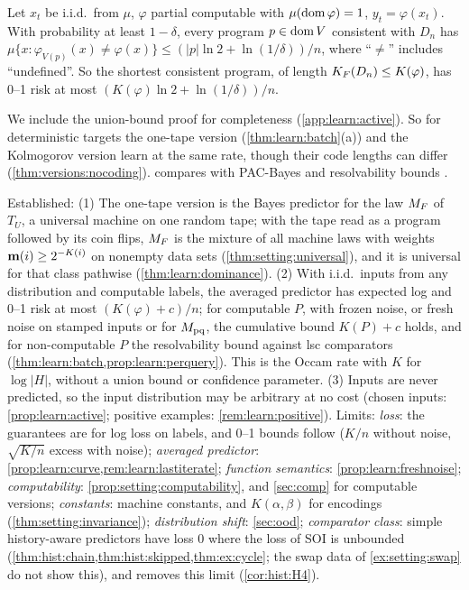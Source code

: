 \begin{proposition}\label{prop:learn:occam}
Let $x_t$ be i.i.d.\ from $\mu$, $\varphi$ partial computable with $\mu(\operatorname{dom}\varphi)=1$, $y_t=\varphi(x_t)$. With probability at least $1-\delta$, every program $p\in\operatorname{dom} V$ consistent with $D_n$ has $\mu\{x:\varphi_{V(p)}(x)\ne\varphi(x)\}\le(|p|\ln2+\ln(1/\delta))/n$, where ``$\ne$'' includes ``undefined''. So the shortest consistent program, of length $K_{F}(D_n)\le K(\varphi)$, has 0--1 risk at most $(K(\varphi)\ln2+\ln(1/\delta))/n$.
\end{proposition}

We include the union-bound proof for completeness (\cref{app:learn:active}). So for deterministic targets the one-tape version (\cref{thm:learn:batch}(a)) and the Kolmogorov version learn at the same rate, though their code lengths can differ (\cref{thm:versions:nocoding}).  compares with PAC-Bayes and resolvability bounds \citep{mcallester1999some,barron1991minimum}.

\begin{remark}\label{rem:learn:ideal}
Established: (1) The one-tape version is the Bayes predictor for the law $M_{F}$ of $T_U$, a universal machine on one random tape; with the tape read as a program followed by its coin flips, $M_{F}$ is the mixture of all machine laws with weights $\mathbf{m}(i)\ge2^{-K(i)}$ on nonempty data sets (\cref{thm:setting:universal}), and it is universal for that class pathwise (\cref{thm:learn:dominance}). (2) With i.i.d.\ inputs from any distribution and computable labels, the averaged predictor has expected log and 0--1 risk at most $(K(\varphi)+c)/n$; for computable $P$, with frozen noise, or fresh noise on stamped inputs or for $M_{\mathrm{pq}}$, the cumulative bound $K(P)+c$ holds, and for non-computable $P$ the resolvability bound against lsc comparators (\cref{thm:learn:batch,prop:learn:perquery}). This is the Occam rate with $K$ for $\log|H|$, without a union bound or confidence parameter. (3) Inputs are never predicted, so the input distribution may be arbitrary at no cost (chosen inputs: \cref{prop:learn:active}; positive examples: \cref{rem:learn:positive}).
Limits: \emph{loss}: the guarantees are for log loss on labels, and 0--1 bounds follow ($K/n$ without noise, $\sqrt{K/n}$ excess with noise); \emph{averaged predictor}: \cref{prop:learn:curve,rem:learn:lastiterate}; \emph{function semantics}: \cref{prop:learn:freshnoise}; \emph{computability}: \cref{prop:setting:computability}, and \cref{sec:comp} for computable versions; \emph{constants}: machine constants, and $K(\alpha,\beta)$ for encodings (\cref{thm:setting:invariance}); \emph{distribution shift}: \cref{sec:ood}; \emph{comparator class}: simple history-aware predictors have loss $0$ where the loss of SOI is unbounded (\cref{thm:hist:chain,thm:hist:skipped,thm:ex:cycle}; the swap data of \cref{ex:setting:swap} do not show this), and \SFIhist{} removes this limit (\cref{cor:hist:H4}).
\end{remark}
